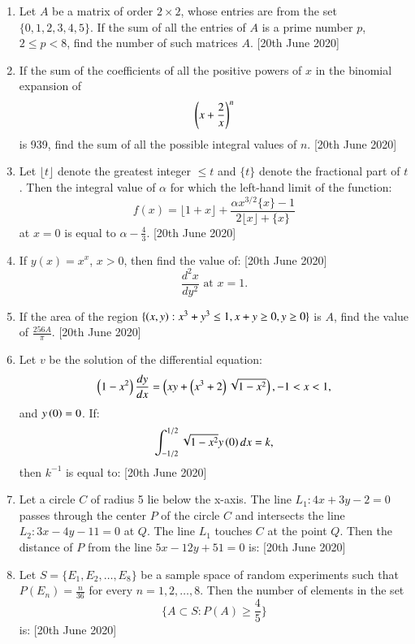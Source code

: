 \documentclass[journal,12pt,onecolumn]{IEEEtran}
\theoremstyle{remark}
\begin{document}
\begin{enumerate}
    \item Let $ A $ be a matrix of order $ 2 \times 2 $, whose entries are from the set $ \{0, 1, 2, 3, 4, 5\} $. If the sum of all the entries of $ A $ is a prime number $ p $, $ 2 \leq p < 8 $, find the number of such matrices $ A $. \hfill{[20th June 2020]}

    \item If the sum of the coefficients of all the positive powers of $ x $ in the binomial expansion of 
    \[
    \left(x + \frac{2}{x}\right)^n
    \]
    is 939, find the sum of all the possible integral values of $ n $. \hfill{[20th June 2020]}


    \item Let $ \lfloor t \rfloor $ denote the greatest integer $ \leq t $ and $ \{ t \} $ denote the fractional part of $ t $. Then the integral value of $ \alpha $ for which the left-hand limit of the function:
    \[
    f(x) = \lfloor 1 + x \rfloor + \frac{\alpha x^{3/2} \{ x \} - 1}{2 \lfloor x \rfloor + \{ x \}}
    \]
    at $ x = 0 $ is equal to $ \alpha - \frac{4}{3} $.  \hfill{[20th June 2020]}

    \item If $ y(x) = x^x $, $ x > 0 $, then find the value of: \hfill{[20th June 2020]}
    \[
    \frac{d^2x}{dy^2} \text{ at } x = 1.
    \]

    \item If the area of the region $ \{ \left(x, y\right): x^3 + y^3 \leq 1, x + y \geq 0, y \geq 0 \} $ is $ A $, find the value of $ \frac{256A}{\pi} $. \hfill{[20th June 2020]}

    \item Let $ v $ be the solution of the differential equation: 
    \[
    \left(1 - x^2\right) \frac{dy}{dx} = \left(xy + \left(x^3 + 2\right)\sqrt{1 - x^2}\right), -1 < x < 1,
    \]
    and $ y\left(0\right) = 0 $. If:
    \[
    \int_{-1/2}^{1/2} \sqrt{1 - x^2} y\left(0\right) dx = k,
    \]
    then $ k^{-1} $ is equal to: \hfill{[20th June 2020]}

    \item Let a circle $ C $ of radius 5 lie below the x-axis. The line $ L_1: 4x + 3y - 2 = 0 $ passes through the center $ P $ of the circle $ C $ and intersects the line $ L_2: 3x - 4y - 11 = 0 $ at $ Q $. The line $ L_1 $ touches $ C $ at the point $ Q $. Then the distance of $ P $ from the line $ 5x - 12y + 51 = 0 $ is:  \hfill{[20th June 2020]}
    
    \item Let $ S = \{ E_1, E_2, \dots, E_8 \} $ be a sample space of random experiments such that $ P(E_n) = \frac{n}{36} $ for every $ n = 1, 2, \dots, 8 $. Then the number of elements in the set 
    \[
    \{ A \subset S : P(A) \geq \frac{4}{5} \}
    \]
    is:  \hfill{[20th June 2020]}
   

    
\end{enumerate}
\end{document}
